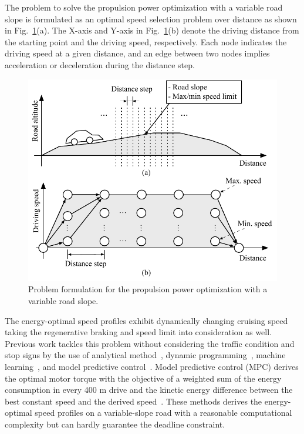 The problem to solve the propulsion power optimization with a variable road slope is formulated as an optimal speed selection problem over distance as shown in Fig.~\ref{fig:formulation}(a). The X-axis and Y-axis in Fig.~\ref{fig:formulation}(b) denote the driving distance from the starting point and the driving speed, respectively. Each node indicates the driving speed at a given distance, and an edge between two nodes implies acceleration or deceleration during the distance step.

\begin{figure}
\centering
\includegraphics[width=1.0\hsize]{Figures/Naehyuck_Chang/Discretization.pdf}
\caption{Problem formulation for the propulsion power optimization with a variable road slope.}
\label{fig:formulation}
\end{figure}      

The energy-optimal speed profiles exhibit dynamically changing cruising speed taking the regenerative braking and speed limit into consideration as well. Previous work tackles this problem without considering the traffic condition and stop signs by the use of analytical method~\cite{Kamal:TITS11,Ozatay:IFAC14}, dynamic programming~\cite{Ozatay:TITS14}, machine learning~\cite{Khayyam:ESA12}, and model predictive control~\cite{Schwickart:JFI15}. Model predictive control (MPC) derives the optimal motor torque with the objective of a weighted sum of the energy consumption in every 400 m drive and the kinetic energy difference between the best constant speed and the derived speed~\cite{Schwickart:JFI15}. These methods derives the energy-optimal speed profiles on a variable-slope road with a reasonable computational complexity but can hardly guarantee the deadline constraint.

